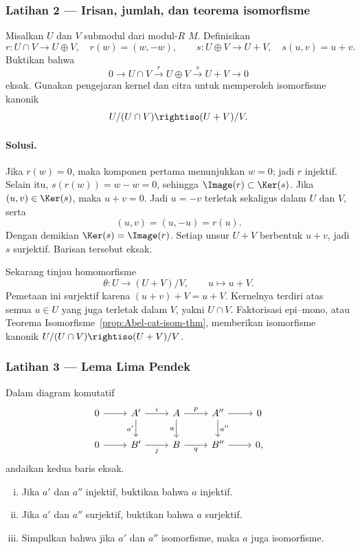 \subsubsection*{Latihan 2 --- Irisan, jumlah, dan teorema isomorfisme}
\hypertarget{o014.mastery.diagram-chasing.001.ex02}{ }
\label{mastery:diagram-chasing-001-ex02}

Misalkan $U$ dan $V$ submodul dari modul-$R$ $M$. Definisikan
\[
	r:U\cap V\longrightarrow U\oplus V,\quad r(w)=(w,-w),
	\qquad
	s:U\oplus V\longrightarrow U+V,\quad s(u,v)=u+v.
\]
Buktikan bahwa
\[
	0\longrightarrow U\cap V\xrightarrow{r}U\oplus V
	\xrightarrow{s}U+V\longrightarrow0
\]
eksak. Gunakan pengejaran kernel dan citra untuk memperoleh isomorfisme
kanonik
\[
	U/(U\cap V)\rightiso (U+V)/V.
\]

\paragraph{Solusi.}
\hypertarget{o014.mastery.diagram-chasing.001.sol02}{ }
Jika $r(w)=0$, maka komponen pertama menunjukkan $w=0$; jadi $r$ injektif.
Selain itu, $s(r(w))=w-w=0$, sehingga $\Image(r)\subset\Ker(s)$. Jika
$(u,v)\in\Ker(s)$, maka $u+v=0$. Jadi $u=-v$ terletak sekaligus dalam
$U$ dan $V$, serta
\[
	(u,v)=(u,-u)=r(u).
\]
Dengan demikian $\Ker(s)=\Image(r)$. Setiap unsur $U+V$ berbentuk $u+v$,
jadi $s$ surjektif. Barisan tersebut eksak.

Sekarang tinjau homomorfisme
\[
	\theta:U\longrightarrow (U+V)/V,\qquad u\longmapsto u+V.
\]
Pemetaan ini surjektif karena $(u+v)+V=u+V$. Kernelnya terdiri atas semua
$u\in U$ yang juga terletak dalam $V$, yakni $U\cap V$. Faktorisasi
epi--mono, atau Teorema Isomorfisme~\ref{prop:Abel-cat-isom-thm}, memberikan
isomorfisme kanonik
$U/(U\cap V)\rightiso (U+V)/V$.

\subsubsection*{Latihan 3 --- Lema Lima Pendek}
\hypertarget{o014.mastery.diagram-chasing.001.ex03}{ }
\label{mastery:diagram-chasing-001-ex03}

Dalam diagram komutatif
\[
\begin{tikzcd}
	0 \arrow[r] & A' \arrow[r, "i"] \arrow[d, "a'"'] & A \arrow[r, "p"] \arrow[d, "a"'] & A'' \arrow[r] \arrow[d, "a''"] & 0 \\
	0 \arrow[r] & B' \arrow[r, "j"'] & B \arrow[r, "q"'] & B'' \arrow[r] & 0,
\end{tikzcd}
\]
andaikan kedua baris eksak.
\begin{enumerate}[(i)]
	\item Jika $a'$ dan $a''$ injektif, buktikan bahwa $a$ injektif.
	\item Jika $a'$ dan $a''$ surjektif, buktikan bahwa $a$ surjektif.
	\item Simpulkan bahwa jika $a'$ dan $a''$ isomorfisme, maka $a$ juga
	isomorfisme.
\end{enumerate}

